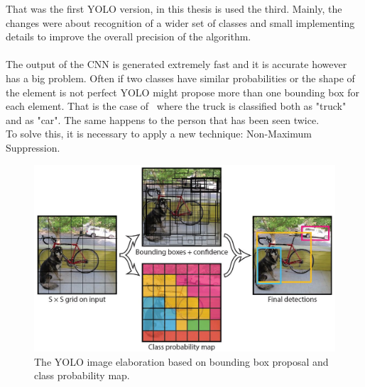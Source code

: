 That was the first YOLO version, in this thesis is used the third\cite{yoloV3}. Mainly, the changes were about recognition of a wider set of classes and small implementing details to improve the overall precision of the algorithm.\\
\\
The output of the CNN is generated extremely fast and it is accurate however has a big problem. Often if two classes have similar probabilities or the shape of the element is not perfect YOLO might propose more than one bounding box for each element. That is the case of~ where the truck is classified both as "truck" and as "car". The same happens to the person that has been seen twice.\\
To solve this, it is necessary to apply a new technique: Non-Maximum Suppression.

\begin{figure}[!h]
	\centering
	\includegraphics[width=0.8\linewidth]{images/detection/howItWorks_yolo}
	\captionsetup{margin=0.5cm}
	\caption[The steps of the YOLO algorithm.]{The YOLO image elaboration based on bounding box proposal and class probability map.}
	\label{fig:howItWorks_yolo}
\end{figure}

